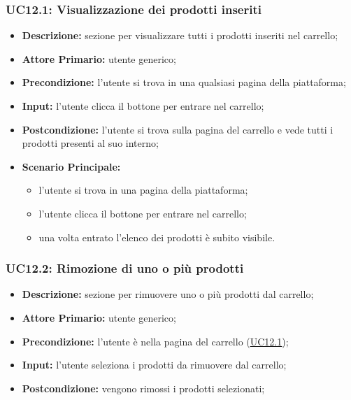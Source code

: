         \subsubsection{UC12.1: Visualizzazione dei prodotti inseriti}
        \label{sec:UC12.1}
        \begin{itemize}
            \item \textbf{Descrizione:} sezione per visualizzare tutti i prodotti inseriti nel carrello;
            \item \textbf{Attore Primario:} utente generico;
            \item \textbf{Precondizione:}  l'utente si trova in una qualsiasi pagina della piattaforma;
            \item \textbf{Input:} l'utente clicca il bottone per entrare nel carrello;
            \item \textbf{Postcondizione:} l'utente si trova sulla pagina del carrello e vede tutti i prodotti presenti al suo interno;
            \item \textbf{Scenario Principale:}
                \begin{itemize}
                    \item l'utente si trova in una pagina della piattaforma;
                    \item l'utente clicca il bottone per entrare nel carrello;
                    \item una volta entrato l'elenco dei prodotti è subito visibile.
                \end{itemize}
        \end{itemize}
        \subsubsection{UC12.2: Rimozione di uno o più prodotti}
        \begin{itemize}
            \item \textbf{Descrizione:} sezione per rimuovere uno o più prodotti dal carrello;
            \item \textbf{Attore Primario:} utente generico;
            \item \textbf{Precondizione:} l'utente è nella pagina del carrello (\hyperref[sec:UC12.1]{\underline{UC12.1}});
            \item \textbf{Input:} l'utente seleziona i prodotti da rimuovere dal carrello;
            \item \textbf{Postcondizione:} vengono rimossi i prodotti selezionati;
        \end{itemize}

